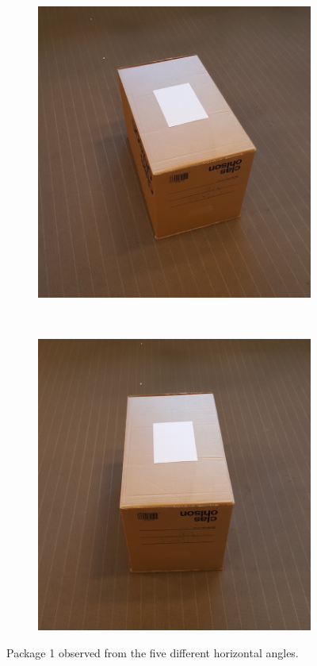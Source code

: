 \begin{figure}
	\begin{subfigure}[b]{0.2\textwidth}
		\includegraphics[width=\textwidth]{figures/angle_4.jpg}
		\label{fig:angle_4}
	\end{subfigure}
	~
	\begin{subfigure}[b]{0.2\textwidth}
		\includegraphics[width=\textwidth]{figures/angle_5.jpg}
		\label{fig:angle_5}
	\end{subfigure}
	\caption{Package 1 observed from the five different horizontal angles.}\label{fig:positions}
\end{figure}